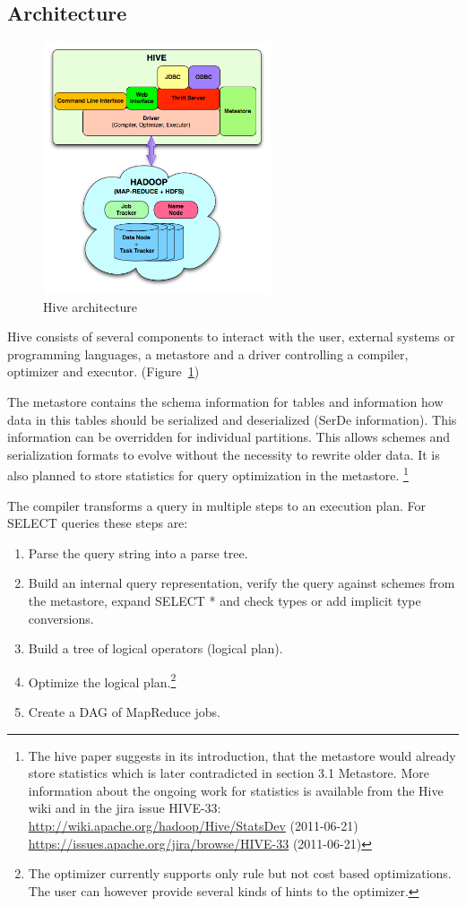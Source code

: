 \documentclass[12pt,a4paper]{scrartcl}		%
\newcommand{\citeurl}[2]{\url{#1} (#2)}
\begin{document}
\subsection{Architecture}
\begin{figure}
  \centering
  \includegraphics[width=0.6\textwidth]{images/hive-architecture.png}  
  \caption{Hive architecture}
  \label{fig:hivearchitecture}
\end{figure}

Hive consists of several components to interact with the user, external systems or programming languages, a metastore and a driver controlling a compiler, optimizer and executor. (Figure~\ref{fig:hivearchitecture})

The metastore contains the schema information for tables and information how data in this tables should be serialized and deserialized (SerDe information). This information can be overridden for individual partitions. This allows schemes and serialization formats to evolve without the necessity to rewrite older data. It is also planned to store statistics for query optimization in the metastore.
\footnote{The hive paper suggests in its introduction, that the metastore would already store statistics which is later contradicted in section 3.1 Metastore. More information about the ongoing work for statistics is available from the Hive wiki and in the jira issue HIVE-33: \citeurl{http://wiki.apache.org/hadoop/Hive/StatsDev}{2011-06-21} \citeurl{https://issues.apache.org/jira/browse/HIVE-33}{2011-06-21}}

The compiler transforms a query in multiple steps to an execution plan. For SELECT queries these steps are:
\begin{enumerate}
\item Parse the query string into a parse tree.
\item Build an internal query representation, verify the query against schemes from the metastore, expand SELECT * and check types or add implicit type conversions.
\item Build a tree of logical operators (logical plan).
\item Optimize the logical plan.\footnote{The optimizer currently supports only rule but not cost based optimizations. The user can however provide several kinds of hints to the optimizer.}
\item Create a DAG of MapReduce jobs.
\end{enumerate}

{}

\end{document}
